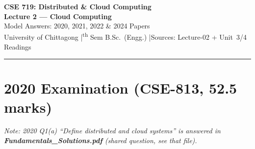 \documentclass[12pt, a4paper]{article}
\begin{document}
\begin{center}
  {\LARGE\bfseries\color{sectionblue} CSE 719: Distributed \& Cloud Computing}\\[0.5em]
  {\Large\bfseries Lecture 2 --- Cloud Computing}\\[0.3em]
  {\large Model Answers: 2020, 2021, 2022 \& 2024 Papers}\\[0.2em]
  {\small University of Chittagong \quad|\textsuperscript{th} Sem B.Sc.\ (Engg.)
  \quad|\quad Sources: Lecture-02 + Unit~3/4 Readings}
\end{center}
\vspace{0.3em}\noindent\rule{\linewidth}{1pt}\vspace{0.5em}
\tableofcontents
\newpage

\section{2020 Examination (CSE-813, 52.5 marks)}

\textit{Note: 2020 Q1(a) ``Define distributed and cloud systems'' is answered in
\textbf{Fundamentals\_Solutions.pdf} (shared question, see that file).}

\end{document}
